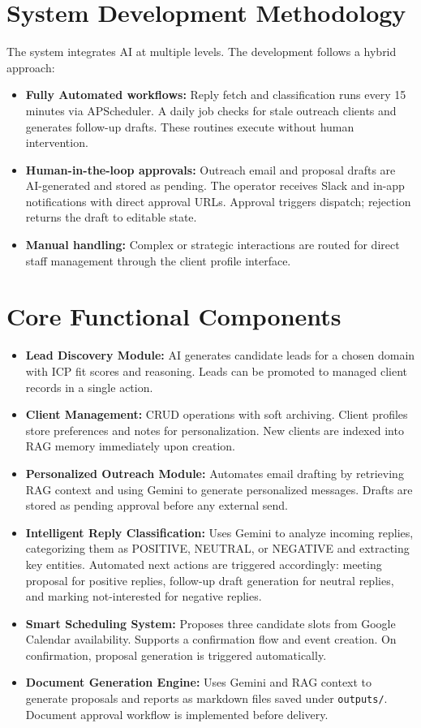 \documentclass[12pt,a4paper]{report}
\begin{document}
\section{System Development Methodology}
The system integrates AI at multiple levels. The development follows a hybrid approach:

\begin{itemize}
    \item \textbf{Fully Automated workflows:} Reply fetch and classification runs every 15 minutes via APScheduler. A daily job checks for stale outreach clients and generates follow-up drafts. These routines execute without human intervention.
    \item \textbf{Human-in-the-loop approvals:} Outreach email and proposal drafts are AI-generated and stored as pending. The operator receives Slack and in-app notifications with direct approval URLs. Approval triggers dispatch; rejection returns the draft to editable state.
    \item \textbf{Manual handling:} Complex or strategic interactions are routed for direct staff management through the client profile interface.
\end{itemize}

\section{Core Functional Components}
\begin{itemize}
    \item \textbf{Lead Discovery Module:} AI generates candidate leads for a chosen domain with ICP fit scores and reasoning. Leads can be promoted to managed client records in a single action.
    \item \textbf{Client Management:} CRUD operations with soft archiving. Client profiles store preferences and notes for personalization. New clients are indexed into RAG memory immediately upon creation.
    \item \textbf{Personalized Outreach Module:} Automates email drafting by retrieving RAG context and using Gemini to generate personalized messages. Drafts are stored as pending approval before any external send.
    \item \textbf{Intelligent Reply Classification:} Uses Gemini to analyze incoming replies, categorizing them as POSITIVE, NEUTRAL, or NEGATIVE and extracting key entities. Automated next actions are triggered accordingly: meeting proposal for positive replies, follow-up draft generation for neutral replies, and marking not-interested for negative replies.
    \item \textbf{Smart Scheduling System:} Proposes three candidate slots from Google Calendar availability. Supports a confirmation flow and event creation. On confirmation, proposal generation is triggered automatically.
    \item \textbf{Document Generation Engine:} Uses Gemini and RAG context to generate proposals and reports as markdown files saved under \texttt{outputs/}. Document approval workflow is implemented before delivery.
\end{itemize}
\end{document}
